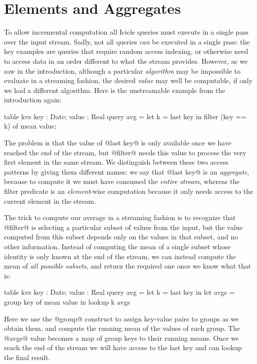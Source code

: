 
\eject
\section{Elements and Aggregates}
To allow incremental computation all Icicle queries must execute in a single pass over the input stream.
Sadly, not all queries \emph{can} be executed in a single pass: the key examples are queries that require random access indexing, or otherwise need to access data in an order different to what the stream provides.
However, as we saw in the introduction, although a particular \emph{algorithm} may be impossible to evaluate in a streaming fashion, the desired \emph{value} may well be computable, if only we had a different algorithm.
Here is the unstreamable example from the introduction again:
\begin{code}
  table kvs { key : Date; value : Real }
  query avg = let k = last key
              in  filter (key == k) of mean value;
\end{code}

The problem is that the value of @last key@ is only available once we have reached the end of the stream, but @filter@ needs this value to process the very first element in the same stream.
We distinguish between these two access patterns by giving them different names: we say that @last key@ is an \emph{aggregate}, because to compute it we must have consumed the \emph{entire stream}, whereas the filter predicate is an \emph{element}-wise computation because it only needs access to the current element in the stream.

The trick to compute our average in a streaming fashion is to recognize that @filter@ is selecting a particular subset of values from the input, but the value computed from this subset depends only on the values in that subset, and no other information. Instead of computing the mean of a single subset whose identity is only known at the end of the stream, we can instead compute the mean of \emph{all possible subsets}, and return the required one once we know what that is:
\begin{code}
  table kvs { key : Date; value : Real } 
  query avg = let k    = last  key in
              let avgs = group key of mean value
              in  lookup k avgs
\end{code}

Here we use the @group@ construct to assign key-value pairs to groups as we obtain them, and compute the running mean of the values of each group. The @avgs@ value becomes a map of group keys to their running means. Once we reach the end of the stream we will have access to the last key and can lookup the final result.


